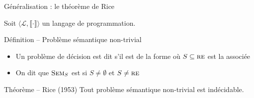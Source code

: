 
\begingroup

\begin{frame}{Généralisation : le théorème de Rice}

  Soit $\langle \mathcal{L}, \llbracket \cdot \rrbracket \rangle$ un langage de programmation. 
  \begin{block}{Définition -- Problème sémantique non-trivial}
    \begin{itemize}
    \item Un problème de décision est dit 
      s'il est de la forme
      où $S \subseteq \textsc{re}$ est la  associée
    \item On dit que $\textsc{Sem}_S$ est  si \alert{$S \neq \emptyset$} et \alert{$S \neq \textsc{re}$}
    \end{itemize}

  \end{block}
  
  \begin{block}{Théorème -- Rice (1953)}
    Tout problème sémantique non-trivial est indécidable.
  \end{block}  

\end{frame}

\endgroup
